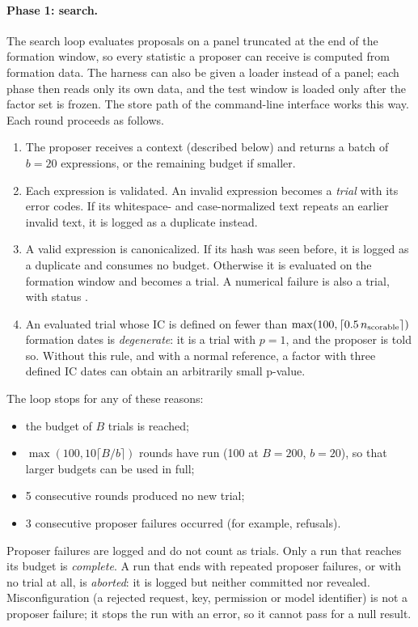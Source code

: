 \paragraph{Phase 1: search.} The search loop evaluates proposals on a panel
truncated at the end of the formation window, so every statistic a proposer
can receive is computed from formation data. The harness can also be given a
loader instead of a panel; each phase then reads only its own data, and the
test window is loaded only after the factor set is frozen. The store path of
the command-line interface works this way. Each round proceeds as follows.
\begin{enumerate}
  \item The proposer receives a context (described below) and returns a batch
    of $b=20$ expressions, or the remaining budget if smaller.
  \item Each expression is validated. An invalid expression becomes a
    \emph{trial} with its error codes. If its whitespace- and
    case-normalized text repeats an earlier invalid text, it is logged as a
    duplicate instead.
  \item A valid expression is canonicalized. If its hash was seen before, it
    is logged as a duplicate and consumes no budget. Otherwise it is
    evaluated on the formation window and becomes a trial. A numerical
    failure is also a trial, with status .
  \item An evaluated trial whose IC is defined on fewer than
    $\max(100, \lceil 0.5\, n_{\mathrm{scorable}}\rceil)$
    formation dates is \emph{degenerate}: it is a trial with $p=1$, and the
    proposer is told so. Without this rule, and with a normal reference, a
    factor with three defined IC dates can obtain an arbitrarily small
    p-value.
\end{enumerate}
The loop stops for any of these reasons:
\begin{itemize}
  \item the budget of $B$ trials is reached;
  \item $\max(100, 10\lceil B/b\rceil)$ rounds have run (100 at $B=200$,
    $b=20$), so that larger budgets can be used in full;
  \item 5 consecutive rounds produced no new trial;
  \item 3 consecutive proposer failures occurred (for example, refusals).
\end{itemize}
Proposer failures are logged and do not count as trials. Only a run that
reaches its budget is \emph{complete}. A run that ends with repeated proposer
failures, or with no trial at all, is \emph{aborted}: it is logged but
neither committed nor revealed. Misconfiguration (a rejected request, key,
permission or model identifier) is not a proposer failure; it stops the run
with an error, so it cannot pass for a null result.

